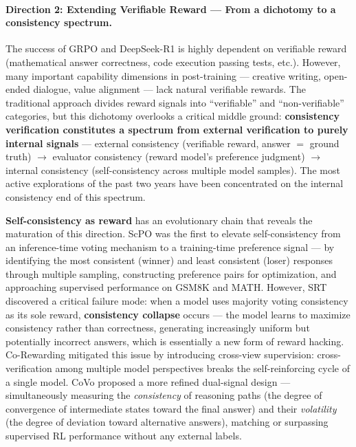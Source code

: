\paragraph{Direction 2: Extending Verifiable Reward --- From a dichotomy to a consistency spectrum.}
The success of GRPO and DeepSeek-R1 is highly dependent on verifiable reward
(mathematical answer correctness, code execution passing tests, etc.).
However, many important capability dimensions in post-training ---
creative writing, open-ended dialogue, value alignment ---
lack natural verifiable rewards.
The traditional approach divides reward signals into ``verifiable'' and ``non-verifiable'' categories,
but this dichotomy overlooks a critical middle ground:
\textbf{consistency verification constitutes a spectrum from external verification to purely internal signals} ---
external consistency (verifiable reward, answer $=$ ground truth)
$\rightarrow$ evaluator consistency (reward model's preference judgment)
$\rightarrow$ internal consistency (self-consistency across multiple model samples).
The most active explorations of the past two years have been concentrated on the internal consistency end of this spectrum.

\textbf{Self-consistency as reward} has an evolutionary chain that reveals the maturation of this direction.
ScPO \cite{prasad2024scpo} was the first to elevate self-consistency from an inference-time voting mechanism
to a training-time preference signal ---
by identifying the most consistent (winner) and least consistent (loser) responses through multiple sampling,
constructing preference pairs for optimization, and approaching supervised performance on GSM8K and MATH.
However, SRT \cite{sheikh2025srt} discovered a critical failure mode:
when a model uses majority voting consistency as its sole reward,
\textbf{consistency collapse} occurs --- the model learns to maximize consistency rather than correctness,
generating increasingly uniform but potentially incorrect answers,
which is essentially a new form of reward hacking.
Co-Rewarding \cite{corewarding2025} mitigated this issue by introducing cross-view supervision:
cross-verification among multiple model perspectives breaks the self-reinforcing cycle of a single model.
CoVo \cite{zhang2025covo} proposed a more refined dual-signal design ---
simultaneously measuring the \textit{consistency} of reasoning paths (the degree of convergence of intermediate states toward the final answer)
and their \textit{volatility} (the degree of deviation toward alternative answers),
matching or surpassing supervised RL performance without any external labels.

